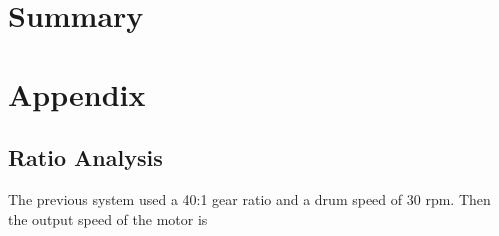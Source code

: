 \documentclass[letterpaper,12pt]{article}
\begin{document}
\section{Summary}

\newpage

\section{Appendix}

\subsection{Ratio Analysis}

The previous system used a 40:1 gear ratio and a drum speed of 30 rpm. Then the output speed of the motor is 
\end{document}
